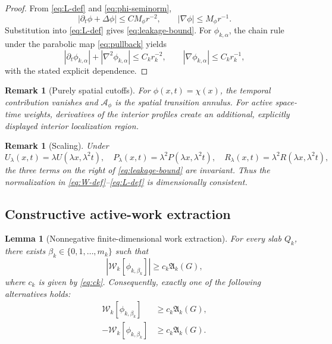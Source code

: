 \documentclass[11pt]{article}
\numberwithin{equation}{section}
\newtheorem{lemma}[theorem]{Lemma}
\newtheorem{remark}[theorem]{Remark}
\newcommand{\abs}[1]{\left\lvert #1\right\rvert}
\newcommand{\W}{\mathcal W}
\newcommand{\Aact}{\mathfrak A}
\begin{document}
\begin{proof}
From \eqref{eq:L-def} and \eqref{eq:phi-seminorm},
\[
|\partial_t\phi+\Delta\phi|
\le C M_\phi r^{-2},
\qquad
|\nabla\phi|
\le M_\phi r^{-1}.
\]
Substitution into \eqref{eq:L-def} gives \eqref{eq:leakage-bound}. For \(\phi_{k,\alpha}\), the chain rule under the parabolic map \eqref{eq:pullback} yields
\[
|\partial_t\phi_{k,\alpha}|+|\nabla^2\phi_{k,\alpha}|
\le C_k r_k^{-2},
\qquad
|\nabla\phi_{k,\alpha}|
\le C_k r_k^{-1},
\]
with the stated explicit dependence.
\end{proof}

\begin{remark}[Purely spatial cutoffs]
For \(\phi(x,t)=\chi(x)\), the temporal contribution vanishes and \(\mathscr A_\phi\) is the spatial transition annulus. For active space-time weights, derivatives of the interior profiles create an additional, explicitly displayed interior localization region.
\end{remark}

\begin{remark}[Scaling]
Under
\[
U_\lambda(x,t)=\lambda U(\lambda x,\lambda^2t),
\quad
P_\lambda(x,t)=\lambda^2P(\lambda x,\lambda^2t),
\quad
R_\lambda(x,t)=\lambda^2R(\lambda x,\lambda^2t),
\]
the three terms on the right of \eqref{eq:leakage-bound} are invariant. Thus the normalization in \eqref{eq:W-def}--\eqref{eq:L-def} is dimensionally consistent.
\end{remark}

\subsection{Constructive active-work extraction}\label{sec:extraction}

\begin{lemma}[Nonnegative finite-dimensional work extraction]\label{lem:extraction}
For every slab \(Q_k\), there exists \(\beta_k\in\{0,1,\ldots,m_k\}\) such that
\begin{equation}\label{eq:extract-lemma}
\abs{\W_k[\phi_{k,\beta_k}]}
\ge
c_k\Aact_k(G),
\end{equation}
where \(c_k\) is given by \eqref{eq:ck}. Consequently, exactly one of the following alternatives holds:
\begin{align}
\W_k[\phi_{k,\beta_k}]
&\ge c_k\Aact_k(G),
\tag{forward}\label{eq:forward-branch}
\\
-\W_k[\phi_{k,\beta_k}]
&\ge c_k\Aact_k(G).
\tag{backscatter}\label{eq:backscatter-branch}
\end{align}
\end{lemma}
\end{document}
